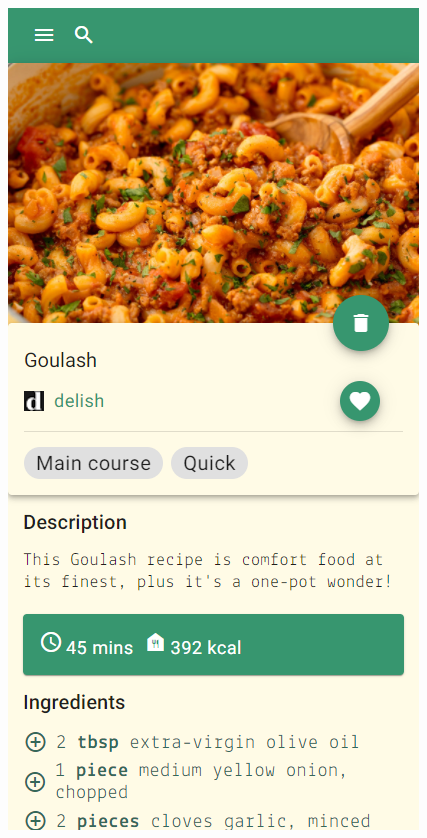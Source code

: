 \documentclass[12pt]{report}
\theoremstyle{definition}
\begin{document}
\includegraphics[scale=0.5]{pictures/mobil_recipe-top.png} \\
\end{document}
